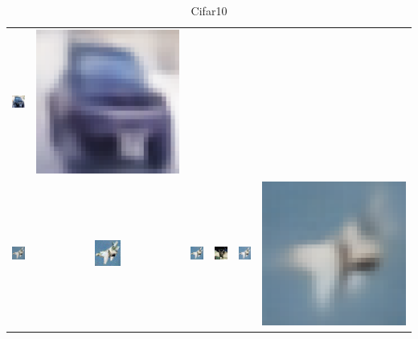 \begin{table}[h!]
{\begin{tabular}{cccccc}
        \includegraphics[width=.145\textwidth]{chapter4/figures/images/cifar10/diffusion_decoder_beta_0/10.png} &
        \includegraphics[width=.145\textwidth]{chapter4/figures/images/cifar10/VAE_reconstruction/10.png} \\
        \includegraphics[width=.145\textwidth]{chapter4/figures/images/cifar10/original/11.png} &   
        \includegraphics[width=.145\textwidth]{chapter4/figures/images/cifar10/reconstruction/11.png} &
        \includegraphics[width=.145\textwidth]{chapter4/figures/images/cifar10/corrected_reconstruction/11.png} &
        \includegraphics[width=.145\textwidth]{chapter4/figures/images/cifar10/diffusion_decoder_beta_0.01/11.png} &
        \includegraphics[width=.145\textwidth]{chapter4/figures/images/cifar10/diffusion_decoder_beta_0/11.png} &
        \includegraphics[width=.145\textwidth]{chapter4/figures/images/cifar10/VAE_reconstruction/11.png} \\
    \end{tabular}}
    \caption{Cifar10}
    \label{ch4:fig:extended_cifar10_qualitative_comparison}
\end{table}


